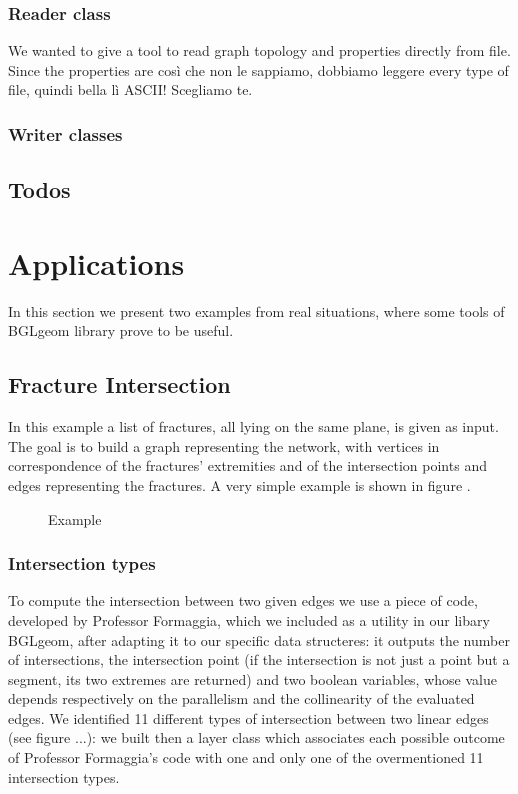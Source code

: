 \documentclass[11pt]{article} %
\begin{document}
		\subsubsection{Reader class}
		We wanted to give a tool to read graph topology and properties directly from file. Since the properties are così che non le sappiamo, dobbiamo leggere every type of file, quindi bella lì ASCII! Scegliamo te.
		
		\subsubsection{Writer classes}

	
	
	
	
	\subsection{Todos}	%


\section{Applications}

	In this section we present two examples from real situations, where some tools of BGLgeom library prove to be useful.

	\subsection{Fracture Intersection}
	In this example a list of fractures, all lying on the same plane, is given as input. The goal is to build a graph representing the network, with vertices in correspondence of the fractures' extremities and of the intersection points  and edges representing the fractures. A very simple example is shown in figure \label{fig:frac_int}.
	\begin{figure}
		\centering 
		\caption{Example}
		\label{fig:frac_int}
	\end{figure}
	
		\subsubsection{Intersection types}
		To compute the intersection between two given edges we use a piece of code, developed by Professor Formaggia, which we included as a utility in our libary BGLgeom, after adapting it to our specific data structeres: it outputs the number of intersections, the intersection point (if the intersection is not just a point but a segment, its two extremes are returned) and two boolean variables, whose value depends respectively on the parallelism and the collinearity of the evaluated edges. \newline
		We identified 11 different types of intersection between two linear edges (see figure ...): we built then a layer class which associates each possible outcome of Professor Formaggia's code with one and only one of the overmentioned 11 intersection types. \newline
			
\end{document}
